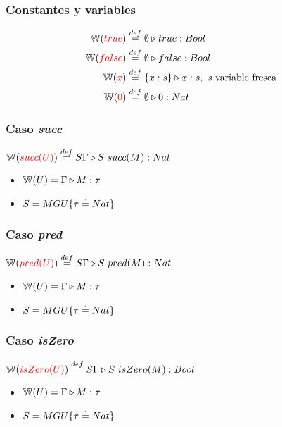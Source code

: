 \documentclass[10pt,a4paper]{article}
\begin{document}
\subsubsection*{Constantes y variables}
\begin{equation*}
\begin{split}
\mathbb{W}({\color{red}true}) &\overset{def}{=} \emptyset\triangleright true : Bool \\
\mathbb{W}({\color{red}false}) &\overset{def}{=} \emptyset\triangleright false : Bool \\
\mathbb{W}({\color{red}x}) &\overset{def}{=} \{x:s\}\triangleright x : s, \text{ \textit{s} variable fresca } \\
\mathbb{W}({\color{red}0}) &\overset{def}{=} \emptyset\triangleright 0 : Nat \\
\end{split}
\end{equation*}
\begin{multicols}{2}

\subsubsection*{Caso \textit{succ}}
$\mathbb{W}({\color{red}succ(U)}) \overset{def}{=} S\Gamma\triangleright S~succ(M) : Nat$
\begin{centrado}
\begin{itemize}
\item $\mathbb{W}(U) = \Gamma\triangleright M : \tau$
\item $S = MGU\{\tau\overset{\cdot}{=} Nat\}$
\end{itemize}
\end{centrado}

\subsubsection*{Caso \textit{pred}}
$\mathbb{W}({\color{red}pred(U)}) \overset{def}{=} S\Gamma\triangleright S~pred(M) : Nat$
\begin{centrado}
\begin{itemize}
\item $\mathbb{W}(U) = \Gamma\triangleright M : \tau$
\item $S = MGU\{\tau\overset{\cdot}{=} Nat\}$
\end{itemize}
\end{centrado}

\end{multicols}

\subsubsection*{Caso \textit{isZero}}
$\mathbb{W}({\color{red}isZero(U)}) \overset{def}{=} S\Gamma\triangleright S~isZero(M) : Bool$
\begin{centrado}
\begin{itemize}
\item $\mathbb{W}(U) = \Gamma\triangleright M : \tau$
\item $S = MGU\{\tau\overset{\cdot}{=} Nat\}$
\end{itemize}
\end{centrado}
\end{document}
